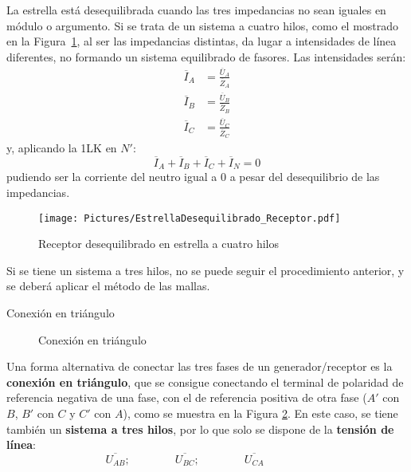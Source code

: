 \documentclass[11pt]{book} %
\makeatletter
\numberwithin{dummy}{section}
\theoremstyle{ocrenumbox}
\theoremstyle{blacknumex}
\theoremstyle{blacknumbox}
\theoremstyle{ocrenum}
\renewcommand{\subsection}{\@startsection {subsection}{2}{\z@}
{-3ex \@plus -0.1ex \@minus -.4ex}
{0.5ex \@plus.2ex }
{\normalfont\sffamily\bfseries}}
\makeatother
\begin{document}
	La estrella está desequilibrada cuando las tres impedancias no sean iguales en módulo o argumento. Si se trata de un sistema a cuatro hilos, como el mostrado en la Figura~\ref{fig.estrelladeseqiulibrado_4hilos}, al ser las impedancias distintas, da lugar a intensidades de línea diferentes, no formando un sistema equilibrado de fasores. Las intensidades serán: 
	\begin{align*}
      \overline{I}_A &= \frac{\overline{U}_A}{\overline{Z}_A}\\
      \overline{I}_B &= \frac{\overline{U}_B}{\overline{Z}_B}\\
      \overline{I}_C &= \frac{\overline{U}_C}{\overline{Z}_C}
    \end{align*}
    y, aplicando la 1LK en $N'$:
    \begin{equation}
        \overline{I}_A  + \overline{I}_B + \overline{I}_C + \overline{I}_N = 0
    \end{equation}
	pudiendo ser la corriente del neutro igual a 0 a pesar del desequilibrio de las impedancias. 
	
	\begin{figure}
	    \centering
	    \texttt{[image: Pictures/EstrellaDesequilibrado\_Receptor.pdf]}
	    \caption{Receptor desequilibrado en estrella a cuatro hilos}
	    \label{fig.estrelladeseqiulibrado_4hilos}
	\end{figure}
	
	Si se tiene un sistema a tres hilos, no se puede seguir el procedimiento anterior, y se deberá aplicar el método de las mallas. 
	
	\subsection{Conexión en triángulo}
	
	\begin{figure}[htbp]
		\centering
		\hfill
		\caption{Conexión en triángulo}
		\label{fig.conexion_triangulo}
	\end{figure}
	
	Una forma alternativa de conectar las tres fases de un generador/receptor es la \textbf{conexión en triángulo}, que se consigue conectando el terminal de polaridad de referencia negativa de una fase, con el de referencia positiva de otra fase ($A'$ con $B$, $B'$ con $C$ y $C'$ con $A$), como se muestra en la Figura \ref{fig.conexion_triangulo}. En este caso, se tiene también un \textbf{sistema a tres hilos}, por lo que solo se dispone de la \textbf{tensión de línea}: 
	\begin{equation*}
	    \overline{U_{AB}};\qquad\qquad \overline{U_{BC}};\qquad\qquad \overline{U_{CA}}\qquad\qquad
	\end{equation*}
	
\end{document}
